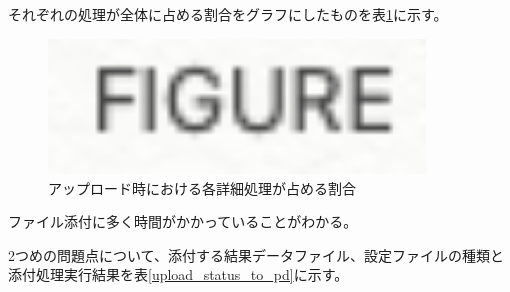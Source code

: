 それぞれの処理が全体に占める割合をグラフにしたものを表\ref{upload_process_detail_gragh}に示す。
\begin{figure}[bpt]\centering
\includegraphics[width=10cm]{figure}
\caption[アップロード時における各詳細処理が占める割合]{アップロード時における各詳細処理が占める割合}
\label{upload_process_detail_gragh}
\end{figure}
ファイル添付に多く時間がかかっていることがわかる。

\newpage
2つめの問題点について、添付する結果データファイル、設定ファイルの種類と添付処理実行結果を表\ref{upload_status_to_pd}に示す。

